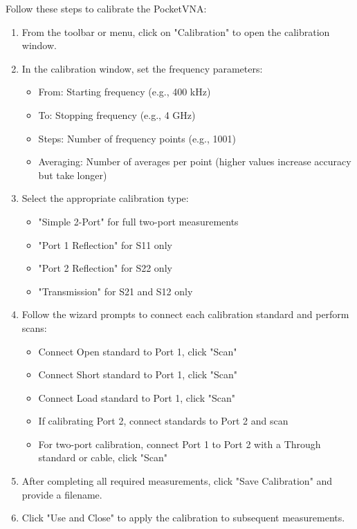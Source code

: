 \documentclass[12pt,a4paper]{article}
\begin{document}
Follow these steps to calibrate the PocketVNA:

\begin{enumerate}
    \item From the toolbar or menu, click on "Calibration" to open the calibration window.
    
    \item In the calibration window, set the frequency parameters:
    \begin{itemize}
        \item From: Starting frequency (e.g., 400 kHz)
        \item To: Stopping frequency (e.g., 4 GHz)
        \item Steps: Number of frequency points (e.g., 1001)
        \item Averaging: Number of averages per point (higher values increase accuracy but take longer)
    \end{itemize}
    
    \item Select the appropriate calibration type:
    \begin{itemize}
        \item "Simple 2-Port" for full two-port measurements
        \item "Port 1 Reflection" for S11 only
        \item "Port 2 Reflection" for S22 only
        \item "Transmission" for S21 and S12 only
    \end{itemize}
    
    \item Follow the wizard prompts to connect each calibration standard and perform scans:
    \begin{itemize}
        \item Connect Open standard to Port 1, click "Scan"
        \item Connect Short standard to Port 1, click "Scan"
        \item Connect Load standard to Port 1, click "Scan"
        \item If calibrating Port 2, connect standards to Port 2 and scan
        \item For two-port calibration, connect Port 1 to Port 2 with a Through standard or cable, click "Scan"
    \end{itemize}
    
    \item After completing all required measurements, click "Save Calibration" and provide a filename.
    
    \item Click "Use and Close" to apply the calibration to subsequent measurements.
\end{enumerate}
\end{document}
